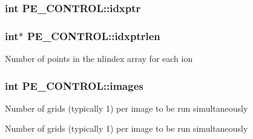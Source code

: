 \hypertarget{struct_p_e___c_o_n_t_r_o_l_afcca46a963458c1aad8126c7e62f716b}{
\subsubsection[{idxptr}]{\setlength{\rightskip}{0pt plus 5cm}int P\-E\-\_\-\-C\-O\-N\-T\-R\-O\-L\-::idxptr}}\label{struct_p_e___c_o_n_t_r_o_l_afcca46a963458c1aad8126c7e62f716b}
\hypertarget{struct_p_e___c_o_n_t_r_o_l_aa882c70df38d76f7ec309e133e7cdfc2}{
\subsubsection[{idxptrlen}]{\setlength{\rightskip}{0pt plus 5cm}int$\ast$ P\-E\-\_\-\-C\-O\-N\-T\-R\-O\-L\-::idxptrlen}}\label{struct_p_e___c_o_n_t_r_o_l_aa882c70df38d76f7ec309e133e7cdfc2}
Number of points in the nlindex array for each ion \hypertarget{struct_p_e___c_o_n_t_r_o_l_a6022ac13fbeda8bc938d2a1aa584fbea}{
\subsubsection[{images}]{\setlength{\rightskip}{0pt plus 5cm}int P\-E\-\_\-\-C\-O\-N\-T\-R\-O\-L\-::images}}\label{struct_p_e___c_o_n_t_r_o_l_a6022ac13fbeda8bc938d2a1aa584fbea}
Number of grids (typically 1) per image to be run simultaneously

\begin{DoxyVerb}Number of grids (typically 1) per image to be run simultaneously
\end{DoxyVerb}

